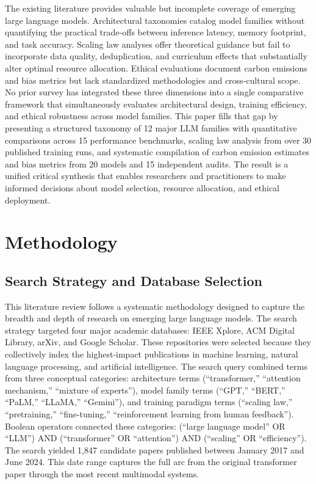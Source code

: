 \documentclass[journal]{IEEEtran}
\begin{document}
The existing literature provides valuable but incomplete coverage of emerging large language models. Architectural taxonomies catalog model families without quantifying the practical trade-offs between inference latency, memory footprint, and task accuracy. Scaling law analyses offer theoretical guidance but fail to incorporate data quality, deduplication, and curriculum effects that substantially alter optimal resource allocation. Ethical evaluations document carbon emissions and bias metrics but lack standardized methodologies and cross-cultural scope. No prior survey has integrated these three dimensions into a single comparative framework that simultaneously evaluates architectural design, training efficiency, and ethical robustness across model families. This paper fills that gap by presenting a structured taxonomy of 12 major LLM families with quantitative comparisons across 15 performance benchmarks, scaling law analysis from over 30 published training runs, and systematic compilation of carbon emission estimates and bias metrics from 20 models and 15 independent audits. The result is a unified critical synthesis that enables researchers and practitioners to make informed decisions about model selection, resource allocation, and ethical deployment.

\section{Methodology}

\subsection{Search Strategy and Database Selection}

This literature review follows a systematic methodology designed to capture the breadth and depth of research on emerging large language models. The search strategy targeted four major academic databases: IEEE Xplore, ACM Digital Library, arXiv, and Google Scholar. These repositories were selected because they collectively index the highest-impact publications in machine learning, natural language processing, and artificial intelligence. The search query combined terms from three conceptual categories: architecture terms (``transformer,'' ``attention mechanism,'' ``mixture of experts''), model family terms (``GPT,'' ``BERT,'' ``PaLM,'' ``LLaMA,'' ``Gemini''), and training paradigm terms (``scaling law,'' ``pretraining,'' ``fine-tuning,'' ``reinforcement learning from human feedback''). Boolean operators connected these categories: (``large language model'' OR ``LLM'') AND (``transformer'' OR ``attention'') AND (``scaling'' OR ``efficiency''). The search yielded 1,847 candidate papers published between January 2017 and June 2024. This date range captures the full arc from the original transformer paper through the most recent multimodal systems.
\end{document}
